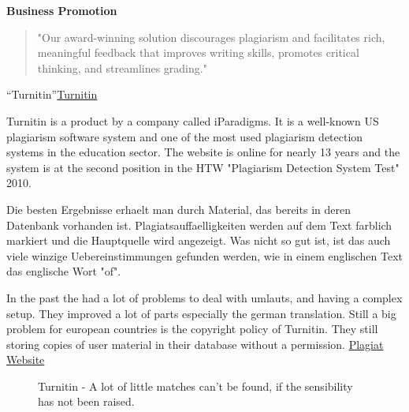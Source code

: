 \textbf{Business Promotion}
\begin{quote}
"Our award-winning solution discourages plagiarism and facilitates rich, meaningful feedback that improves writing skills, promotes critical thinking, and streamlines grading."
\end{quote}
\enquote{Turnitin}\citep{Turnitin Business Promotion}\href{http://www.turnitin.com}{Turnitin}


Turnitin is a product by a company called iParadigms. It is a well-known US plagiarism software system and one of the most used plagiarism detection systems in the education sector. The website is online for nearly 13 years and the system is at the second position in the HTW "Plagiarism Detection System Test" 2010.  

Die besten Ergebnisse erhaelt man durch Material, das bereits in deren Datenbank vorhanden ist. Plagiatsauffaelligkeiten werden auf dem Text farblich markiert und die Hauptquelle wird angezeigt.
Was nicht so gut ist, ist das auch viele winzige Uebereinstimmungen gefunden werden, wie in einem englischen Text das englische Wort "of".


In the past the had a lot of problems to deal with umlauts, and having a complex setup. They improved a lot of parts especially the german translation. Still a big problem for european countries is the copyright policy of Turnitin. They still storing copies of user material in their database without a permission. \href{http://plagiat.htw-berlin.de/software-en/2010-2/s10-01-turnitin/}{Plagiat Website}

 \begin{figure}[!h]
  \centering
  \caption{Turnitin - A lot of little matches can't be found, if the sensibility has not been raised.}
  \label{fig:Turnitin overview}
\end{figure}
 
